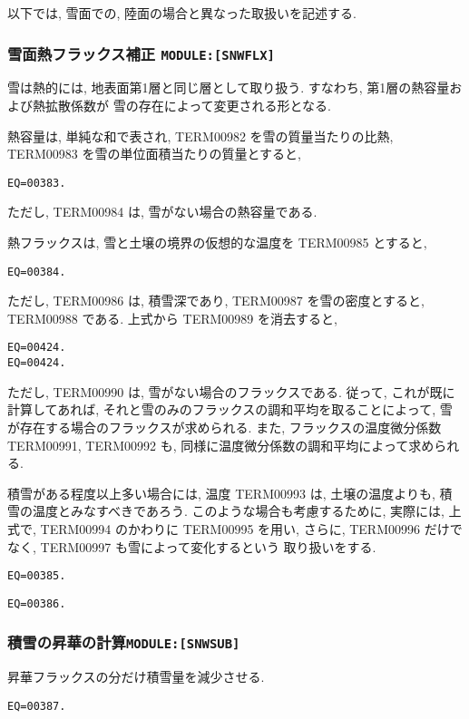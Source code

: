 \bigskip
以下では, 雪面での, 陸面の場合と異なった取扱いを記述する.
\bigskip

\subsubsection{雪面熱フラックス補正 \texttt{MODULE:[SNWFLX]}}


雪は熱的には, 地表面第1層と同じ層として取り扱う.
すなわち, 第1層の熱容量および熱拡散係数が
雪の存在によって変更される形となる.

熱容量は, 単純な和で表され,
TERM00982 を雪の質量当たりの比熱, TERM00983 を雪の単位面積当たりの質量とすると,
\begin{verbatim}
EQ=00383.
\end{verbatim}
ただし, TERM00984 は, 雪がない場合の熱容量である.

熱フラックスは, 雪と土壌の境界の仮想的な温度を TERM00985 とすると,
\begin{verbatim}
EQ=00384.
\end{verbatim}
ただし, TERM00986 は, 積雪深であり, 
TERM00987 を雪の密度とすると, TERM00988 である.
上式から TERM00989 を消去すると,
\begin{verbatim}
EQ=00424.
EQ=00424.
\end{verbatim}
ただし, TERM00990 は, 雪がない場合のフラックスである.
従って, これが既に計算してあれば,
それと雪のみのフラックスの調和平均を取ることによって,
雪が存在する場合のフラックスが求められる.
また, フラックスの温度微分係数 TERM00991, TERM00992
も, 同様に温度微分係数の調和平均によって求められる.

積雪がある程度以上多い場合には, 
温度 TERM00993 は, 土壌の温度よりも, 積雪の温度とみなすべきであろう.
このような場合も考慮するために, 実際には, 
上式で, TERM00994 のかわりに TERM00995 を用い, 
さらに, TERM00996 だけでなく, TERM00997 も雪によって変化するという
取り扱いをする.

\begin{verbatim}
EQ=00385.
\end{verbatim}
\begin{verbatim}
EQ=00386.
\end{verbatim}

\subsubsection{積雪の昇華の計算\texttt{MODULE:[SNWSUB]}}

昇華フラックスの分だけ積雪量を減少させる. 
\begin{verbatim}
EQ=00387.
\end{verbatim}

